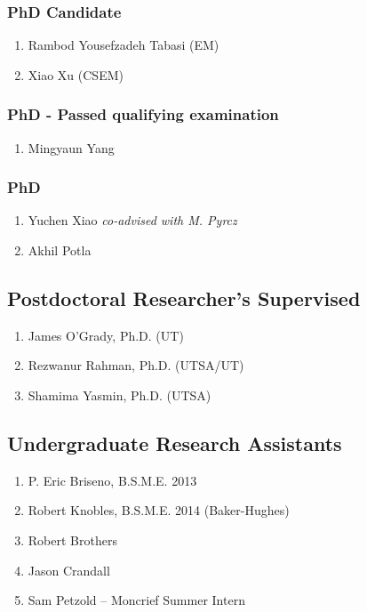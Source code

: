 \subsubsection*{PhD Candidate}
\begin{enumerate}
    \item Rambod Yousefzadeh Tabasi (EM)
    \item Xiao Xu (CSEM)
\end{enumerate}

\subsubsection*{PhD - Passed qualifying examination}
\begin{enumerate}
    \item Mingyaun Yang
\end{enumerate}

\subsubsection*{PhD}
\begin{enumerate}
    \item Yuchen Xiao \emph{co-advised with M. Pyrcz}
    \item Akhil Potla 
\end{enumerate}


\subsection*{Postdoctoral Researcher's Supervised}
  \begin{enumerate}
      \item James O'Grady, Ph.D. (UT)
      \item Rezwanur Rahman, Ph.D. (UTSA/UT)
      \item Shamima Yasmin, Ph.D. (UTSA)
  \end{enumerate}

\subsection*{Undergraduate Research Assistants}
  \begin{enumerate}
    \item P. Eric Briseno, B.S.M.E. 2013
    \item Robert Knobles, B.S.M.E. 2014 (Baker-Hughes)
    \item Robert Brothers
    \item Jason Crandall
    \item Sam Petzold -- Moncrief Summer Intern
  \end{enumerate}

